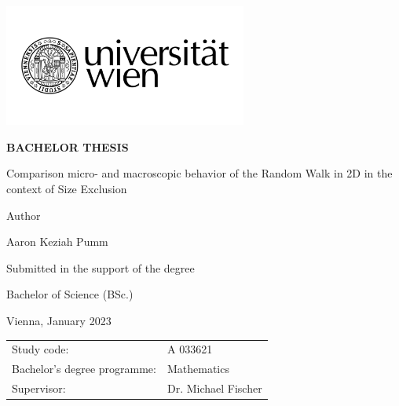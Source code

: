 \begin{titlepage}
\vspace*{-2cm}  %
\begin{flushright}
    \includegraphics[width=8cm]{Uni_Logo_2016_SW}
\end{flushright}
\vspace{1cm}

\begin{center}  %
    \Huge{\textbf{\textsf{\MakeUppercase{
         Bachelor Thesis
    }}}}
    \vspace{1cm}

    \large{\textsf{  %
    }}
    \vspace{.1cm}

    \LARGE{\textsf{  Comparison micro- and macroscopic behavior of the Random Walk in 2D in the context of Size Exclusion
    }}
    \vspace{2cm}

    \large{\textsf{  %
        Author
    }}

    \Large{\textsf{  Aaron Keziah Pumm
    }}
    \vspace{3cm}

    \large{\textsf{
        Submitted in the support of the degree  %
    }}

    \Large{\textsf{  %
        Bachelor of Science (BSc.)
    }}
\end{center}
\vspace{1cm}

\pagestyle{empty}

\noindent\textsf{Vienna, January 2023}  %
\vfill

\noindent\begin{tabular}{@{}ll}
\textsf{Study code:}
&
\textsf{A 033621}  %
\\
\textsf{Bachelor's degree programme:}
&
\textsf{Mathematics}  %
\\
\textsf{Supervisor:}
&
\textsf{Dr. Michael Fischer}  %
\end{tabular}

\end{titlepage}
